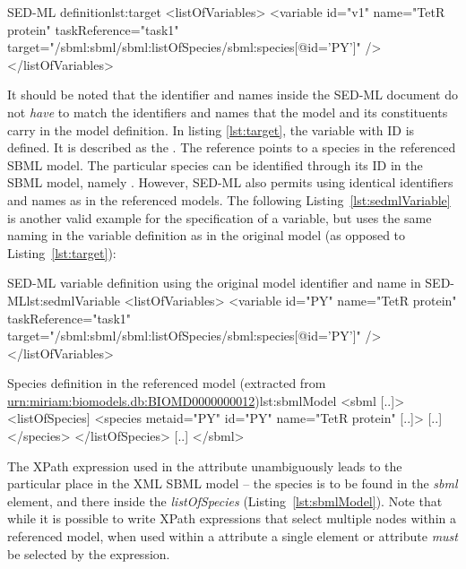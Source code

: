 %
\begin{myXmlLst}{SED-ML  definition}{lst:target}
  <listOfVariables>
    <variable id="v1" name="TetR protein" taskReference="task1" 
      target="/sbml:sbml/sbml:listOfSpecies/sbml:species[@id='PY']" />
  </listOfVariables>
\end{myXmlLst}

It should be noted that the identifier and names inside the SED-ML document do not \emph{have} to match the identifiers and names that the model and its constituents carry in the model definition.
In listing \vref{lst:target}, the variable with ID  is defined. It is described as the . The reference points to a species in the referenced SBML model. The particular species can be identified through its ID in the SBML model, namely .
However, SED-ML also permits using identical identifiers and names as in the referenced models. The following Listing~\vref{lst:sedmlVariable} is another valid example for the specification of a variable, but uses the same naming in the variable definition as in the original model (as opposed to Listing~\ref{lst:target}):

\begin{myXmlLst}{SED-ML variable definition using the original model identifier and name in SED-ML}{lst:sedmlVariable}
   <listOfVariables>
    <variable id="PY" name="TetR protein"  taskReference="task1" 
     target="/sbml:sbml/sbml:listOfSpecies/sbml:species[@id='PY']" />
   </listOfVariables>
\end{myXmlLst}

\begin{myXmlLst}{Species definition in the referenced model (extracted from \url{urn:miriam:biomodels.db:BIOMD0000000012})}{lst:sbmlModel}
<sbml [..]>
 <listOfSpecies]
  <species metaid="PY" id="PY" name="TetR protein" [..]>
   [..]
  </species>
 </listOfSpecies>
 [..]
</sbml>
\end{myXmlLst}

The XPath expression used in the  attribute unambiguously leads to the particular place in the XML SBML model -- the species is to be found in the \emph{sbml} element, and there inside the \emph{listOfSpecies} (Listing~\vref{lst:sbmlModel}). Note that while it is possible to write XPath expressions that select multiple nodes within a referenced model, when used within a  attribute a single element or attribute \emph{must} be selected by the expression.


